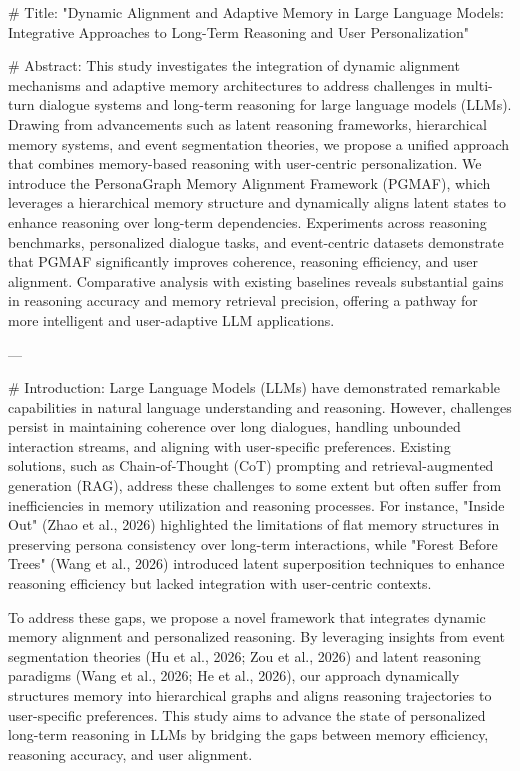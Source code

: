 # Title:
"Dynamic Alignment and Adaptive Memory in Large Language Models: Integrative Approaches to Long-Term Reasoning and User Personalization"

# Abstract:
This study investigates the integration of dynamic alignment mechanisms and adaptive memory architectures to address challenges in multi-turn dialogue systems and long-term reasoning for large language models (LLMs). Drawing from advancements such as latent reasoning frameworks, hierarchical memory systems, and event segmentation theories, we propose a unified approach that combines memory-based reasoning with user-centric personalization. We introduce the PersonaGraph Memory Alignment Framework (PGMAF), which leverages a hierarchical memory structure and dynamically aligns latent states to enhance reasoning over long-term dependencies. Experiments across reasoning benchmarks, personalized dialogue tasks, and event-centric datasets demonstrate that PGMAF significantly improves coherence, reasoning efficiency, and user alignment. Comparative analysis with existing baselines reveals substantial gains in reasoning accuracy and memory retrieval precision, offering a pathway for more intelligent and user-adaptive LLM applications.

---

# Introduction:
Large Language Models (LLMs) have demonstrated remarkable capabilities in natural language understanding and reasoning. However, challenges persist in maintaining coherence over long dialogues, handling unbounded interaction streams, and aligning with user-specific preferences. Existing solutions, such as Chain-of-Thought (CoT) prompting and retrieval-augmented generation (RAG), address these challenges to some extent but often suffer from inefficiencies in memory utilization and reasoning processes. For instance, "Inside Out" (Zhao et al., 2026) highlighted the limitations of flat memory structures in preserving persona consistency over long-term interactions, while "Forest Before Trees" (Wang et al., 2026) introduced latent superposition techniques to enhance reasoning efficiency but lacked integration with user-centric contexts.

To address these gaps, we propose a novel framework that integrates dynamic memory alignment and personalized reasoning. By leveraging insights from event segmentation theories (Hu et al., 2026; Zou et al., 2026) and latent reasoning paradigms (Wang et al., 2026; He et al., 2026), our approach dynamically structures memory into hierarchical graphs and aligns reasoning trajectories to user-specific preferences. This study aims to advance the state of personalized long-term reasoning in LLMs by bridging the gaps between memory efficiency, reasoning accuracy, and user alignment.


